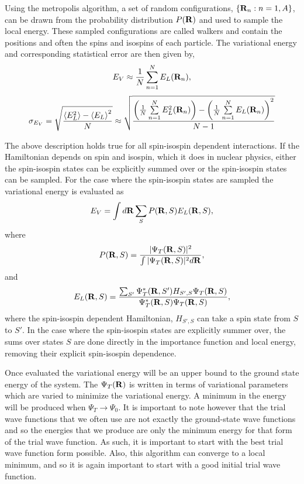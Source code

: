 Using the metropolis algorithm, a set of random configurations, $\{\mathbf{R}_n: n=1,A\}$, can be drawn from the probability distribution $P(\mathbf{R})$ and used to sample the local energy. These sampled configurations are called walkers and contain the positions and often the spins and isospins of each particle. The variational energy and corresponding statistical error are then given by,
\begin{equation} 
  E_V \approx \frac{1}{N} \sum\limits_{n=1}^N E_L({\mathbf{R}_n}),
\end{equation}
\begin{equation} 
  \sigma_{E_V} = \sqrt{\frac{\left<E_L^2\right>-\left<E_L\right>^2}{N}} \approx \sqrt{\frac{\left(\frac{1}{N}\sum\limits_{n=1}^NE_L^2(\mathbf{R}_n)\right) - \left(\frac{1}{N}\sum\limits_{n=1}^NE_L(\mathbf{R}_n)\right)^2}{N-1}}
\end{equation}

The above description holds true for all spin-isospin dependent interactions. If the Hamiltonian depends on spin and isospin, which it does in nuclear physics, either the spin-isospin states can be explicitly summed over or the spin-isospin states can be sampled. For the case where the spin-isospin states are sampled the variational energy is evaluated as
\begin{equation} 
  E_V = \int d\mathbf{R} \sum\limits_S P(\mathbf{R},S) E_L(\mathbf{R},S),
\end{equation}
where
\begin{equation}
   P(\mathbf{R},S) = \frac{|\Psi_T(\mathbf{R},S)|^2}{\int|\Psi_T(\mathbf{R},S)|^2d\mathbf{R}},
\end{equation}
and
\begin{equation}
   E_L(\mathbf{R},S) = \frac{\sum_{S'}\Psi_T^*(\mathbf{R},S')H_{S',S}\Psi_T(\mathbf{R},S)}{\Psi_T^*(\mathbf{R},S)\Psi_T(\mathbf{R},S)},
\end{equation}
where the spin-isospin dependent Hamiltonian, $H_{S',S}$ can take a spin state from $S$ to $S'$. In the case where the spin-isospin states are explicitly summer over, the sums over states $S$ are done directly in the importance function and local energy, removing their explicit spin-isospin dependence.

Once evaluated the variational energy will be an upper bound to the ground state energy of the system. The $\Psi_T(\mathbf{R})$ is written in terms of variational parameters which are varied to minimize the variational energy. A minimum in the energy will be produced when $\Psi_T \rightarrow \Psi_0$. It is important to note however that the trial wave functions that we often use are not exactly the ground-state wave functions and so the energies that we produce are only the minimum energy for that form of the trial wave function. As such, it is important to start with the best trial wave function form possible. Also, this algorithm can converge to a local minimum, and so it is again important to start with a good initial trial wave function.

